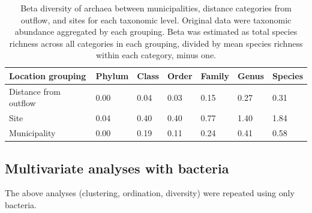 \documentclass[letterpaper,12pt]{article}\usepackage[]{graphicx}\usepackage[]{color}
\begin{document}
\begin{table}[!tbp]
\caption{Beta diversity of archaea between municipalities, distance categories from outflow, and sites for each taxonomic level.  Original data were taxonomic abundance aggregated by each grouping.  Beta was estimated as total species richness across all categories in each grouping, divided by mean species richness within each category, minus one.\label{tab:beta_arch}} 
\begin{center}
\begin{tabular}{lllllll}
\hline\hline
\multicolumn{1}{l}{Location grouping}&\multicolumn{1}{c}{Phylum}&\multicolumn{1}{c}{Class}&\multicolumn{1}{c}{Order}&\multicolumn{1}{c}{Family}&\multicolumn{1}{c}{Genus}&\multicolumn{1}{c}{Species}\tabularnewline
\hline
Distance from outflow&0.00&0.04&0.03&0.15&0.27&0.31\tabularnewline
Site&0.04&0.40&0.40&0.77&1.40&1.84\tabularnewline
Municipality&0.00&0.19&0.11&0.24&0.41&0.58\tabularnewline
\hline
\end{tabular}\end{center}

\end{table}


\subsection{Multivariate analyses with bacteria}

The above analyses (clustering, ordination, diversity) were repeated using only bacteria.  
\end{document}
